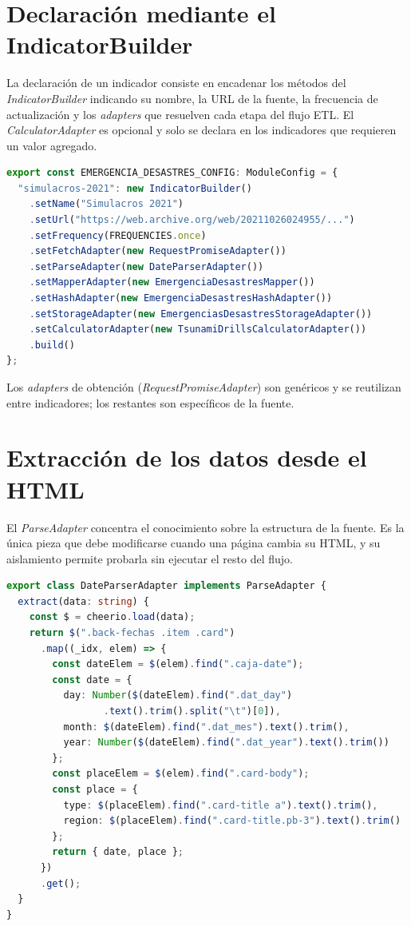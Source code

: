 \documentclass[12pt,letterpaper,oneside]{report}
\begin{document}
\section{Declaraci\'on mediante el IndicatorBuilder}
\label{app:codigo-config}

La declaraci\'on de un indicador consiste en encadenar los m\'etodos del \textit{IndicatorBuilder} indicando su nombre, la URL de la fuente, la frecuencia de actualizaci\'on y los \textit{adapters} que resuelven cada etapa del flujo ETL. El \textit{CalculatorAdapter} es opcional y solo se declara en los indicadores que requieren un valor agregado.

\begin{lstlisting}[style=codigo, language=TypeScript]
export const EMERGENCIA_DESASTRES_CONFIG: ModuleConfig = {
  "simulacros-2021": new IndicatorBuilder()
    .setName("Simulacros 2021")
    .setUrl("https://web.archive.org/web/20211026024955/...")
    .setFrequency(FREQUENCIES.once)
    .setFetchAdapter(new RequestPromiseAdapter())
    .setParseAdapter(new DateParserAdapter())
    .setMapperAdapter(new EmergenciaDesastresMapper())
    .setHashAdapter(new EmergenciaDesastresHashAdapter())
    .setStorageAdapter(new EmergenciasDesastresStorageAdapter())
    .setCalculatorAdapter(new TsunamiDrillsCalculatorAdapter())
    .build()
};
\end{lstlisting}

Los \textit{adapters} de obtenci\'on (\textit{RequestPromiseAdapter}) son gen\'ericos y se reutilizan entre indicadores; los restantes son espec\'ificos de la fuente.

\section{Extracci\'on de los datos desde el HTML}
\label{app:codigo-parse}

El \textit{ParseAdapter} concentra el conocimiento sobre la estructura de la fuente. Es la \'unica pieza que debe modificarse cuando una p\'agina cambia su HTML, y su aislamiento permite probarla sin ejecutar el resto del flujo.

\begin{lstlisting}[style=codigo, language=TypeScript]
export class DateParserAdapter implements ParseAdapter {
  extract(data: string) {
    const $ = cheerio.load(data);
    return $(".back-fechas .item .card")
      .map((_idx, elem) => {
        const dateElem = $(elem).find(".caja-date");
        const date = {
          day: Number($(dateElem).find(".dat_day")
                 .text().trim().split("\t")[0]),
          month: $(dateElem).find(".dat_mes").text().trim(),
          year: Number($(dateElem).find(".dat_year").text().trim())
        };
        const placeElem = $(elem).find(".card-body");
        const place = {
          type: $(placeElem).find(".card-title a").text().trim(),
          region: $(placeElem).find(".card-title.pb-3").text().trim()
        };
        return { date, place };
      })
      .get();
  }
}
\end{lstlisting}
\end{document}
